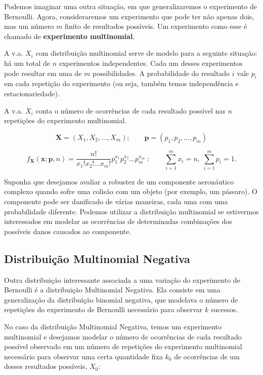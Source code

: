 \documentclass[
]{book}
\theoremstyle{definition}
\theoremstyle{definition}
\theoremstyle{definition}
\theoremstyle{remark}
\begin{document}
Podemos imaginar uma outra situação, em que generalizaremos o experimento de Bernoulli. Agora, consideraremos um experimento que pode ter não apenas dois, mas um número \(m\) finito de resultados possíveis. Um experimento como esse é chamado de \textbf{experimento multinomial}.

A v.a. \(X_i\) com distribuição multinomial serve de modelo para a seguinte situação: há um total de \(n\) experimentos independentes. Cada um desses experimentos pode resultar em uma de \(m\) possibilidades. A probabilidade do resultado \(i\) vale \(p_i\) em cada repetição do experimento (ou seja, também temos independência e estacionariedade).

A v.a. \(X_i\) conta o número de ocorrências de cada resultado possível nas \(n\) repetições do experimento multinomial.

\[\mathbf{X} = (X_1, X_2, \ldots, X_m); \qquad
   \mathbf{p} = (p_1, p_2, \ldots, p_m)\]

\[f_{\mathbf{X}}(\mathbf{x}; \mathbf{p}, n) = \frac{n!}{x_1!x_2! \ldots x_m!} p_1^{x_1} p_2^{x_2} \ldots p_m^{x_m} \;:\qquad  \sum_{i=1}^{m} x_i = n, \;\sum_{i=1}^{m} p_i = 1.\]

Suponha que desejamos avaliar a robustez de um componente aeronáutico complexo quando sofre uma colisão com um objeto (por exemplo, um pássaro). O componente pode ser danificado de várias maneiras, cada uma com uma probabilidade diferente. Podemos utilizar a distribuição multinomial se estivermos interessados em modelar as ocorrências de determinadas combinações dos possíveis danos causados ao componente.

\hypertarget{distribuiuxe7uxe3o-multinomial-negativa}{%
\subsection*{Distribuição Multinomial Negativa}\label{distribuiuxe7uxe3o-multinomial-negativa}}

Outra distribuição interessante associada a uma variação do experimento de Bernoulli é a distribuição Multinomial Negativa. Ela consiste em uma generalização da distribuição binomial negativa, que modelava o número de repetições do experimento de Bernoulli necessário para observar \(k\) sucessos.

No caso da distribuição Multinomial Negativa, temos um experimento multinomial e desejamos modelar o número de ocorrências de cada resultado possível observado em um número de repetições do experimento multinomial necessário para observar uma certa quantidade fixa \(k_0\) de ocorrências de um desses resultados possíveis, \(X_0\):
\end{document}
